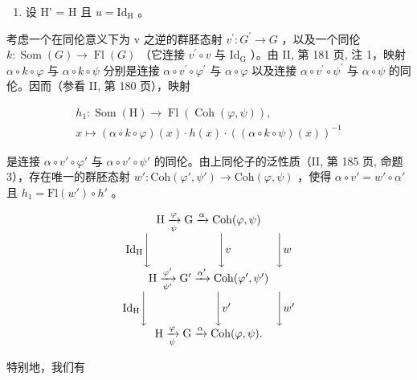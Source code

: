 \begin{enumerate}
\def\labelenumi{\arabic{enumi})}
\tightlist
\item
  设 H' = H 且 \(u = \mathrm{Id}_{\mathrm{H}}\) 。
\end{enumerate}

考虑一个在同伦意义下为 v 之逆的群胚态射 \(v^{\prime}: G^{\prime} \to G\) ，以及一个同伦 \(k: \operatorname{Som}(G) \to \operatorname{Fl}(G)\) （它连接 \(v^{\prime} \circ v\) 与 \(\mathrm{Id}_{\mathrm{G}}\) ）。由 II, 第 181 页, 注 1，映射 \(\alpha \circ k \circ \varphi\) 与 \(\alpha \circ k \circ \psi\) 分别是连接 \(\alpha \circ v^{\prime} \circ \varphi^{\prime}\) 与 \(\alpha \circ \varphi\) 以及连接 \(\alpha\circ v^{\prime}\circ\psi^{\prime}\) 与 \(\alpha\circ\psi\) 的同伦。因而（参看 II, 第 180 页），映射

\[
\begin{array}{c} h _ {1} \colon \operatorname{Som} (\mathrm{H}) \to \operatorname{Fl} (\operatorname{Coh} (\varphi , \psi)), \\ x \mapsto (\alpha \circ k \circ \varphi) (x) \cdot h (x) \cdot ((\alpha \circ k \circ \psi) (x)) ^ {- 1} \end{array}
\]

是连接 \(\alpha \circ v' \circ \varphi'\) 与 \(\alpha \circ v' \circ \psi'\) 的同伦。由上同伦子的泛性质（II, 第 185 页, 命题 3），存在唯一的群胚态射 \(w'\colon \mathrm{Coh}(\varphi', \psi') \to \mathrm{Coh}(\varphi, \psi)\) ，使得 \(\alpha \circ v' = w' \circ \alpha'\) 且 \(h_1 = \mathrm{Fl}(w') \circ h'\) 。

\[
\begin{array}{c} \mathrm{H} \xrightarrow [ \psi ]{\varphi} \mathrm{G} \xrightarrow {\alpha} \mathrm{Coh} (\varphi , \psi) \\ \mathrm{Id} _ {\mathrm{H}} \Biggl \downarrow \qquad \qquad \qquad \Biggl \downarrow v \qquad \qquad \Biggl \downarrow w \\ \mathrm{H} \xrightarrow [ \psi^ {\prime} ]{\varphi^ {\prime}} \mathrm{G} ^ {\prime} \xrightarrow {\alpha^ {\prime}} \mathrm{Coh} (\varphi^ {\prime}, \psi^ {\prime}) \\ \mathrm{Id} _ {\mathrm{H}} \Biggl \downarrow \qquad \qquad \qquad \Biggl \downarrow v ^ {\prime} \qquad \qquad \Biggl \downarrow w ^ {\prime} \\ \mathrm{H} \xrightarrow [ \psi ]{\varphi} \mathrm{G} \xrightarrow {\alpha} \mathrm{Coh} (\varphi , \psi)  . \end{array}
\]

特别地，我们有

